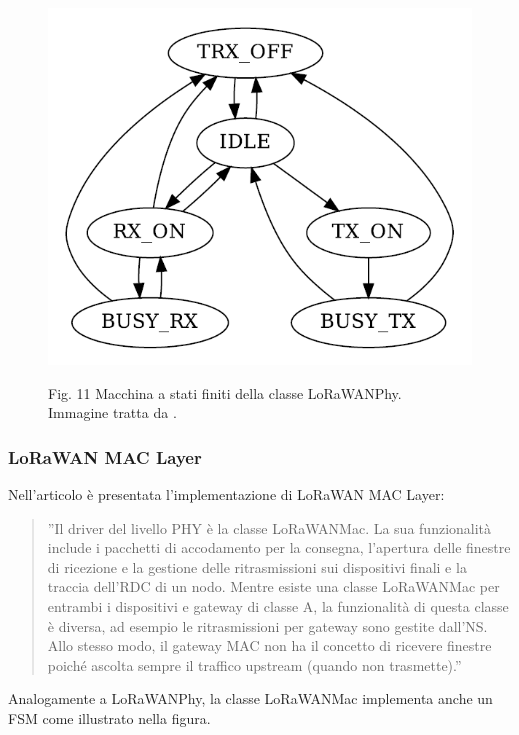 \documentclass[a4paper]{report} %
\begin{document}
\begin{figure}
\centering
\includegraphics[scale=.5]{Immagini/MSFLoRaWAN.png}

Fig. 11 Macchina a stati finiti della classe LoRaWANPhy.\\
Immagine tratta da \cite{art:rif.49}. \\
\end{figure}

\subsubsection{LoRaWAN MAC Layer} 
Nell'articolo \cite{art:rif.49} è presentata l'implementazione di LoRaWAN MAC Layer:
\begin{quote}
	''Il driver del livello PHY è la classe LoRaWANMac. La sua funzionalità include i pacchetti di accodamento per la consegna, l'apertura delle finestre di ricezione e la gestione delle ritrasmissioni sui dispositivi finali e la traccia dell'RDC di un nodo. Mentre esiste una classe LoRaWANMac per entrambi i dispositivi e gateway di classe A, la funzionalità di questa classe è diversa, ad esempio le ritrasmissioni per gateway sono gestite dall'NS. Allo stesso modo, il gateway MAC non ha il concetto di ricevere finestre poiché ascolta sempre il traffico upstream (quando non trasmette).''
\end{quote}
Analogamente a LoRaWANPhy, la classe LoRaWANMac implementa anche un FSM come illustrato nella figura. 
\end{document}
